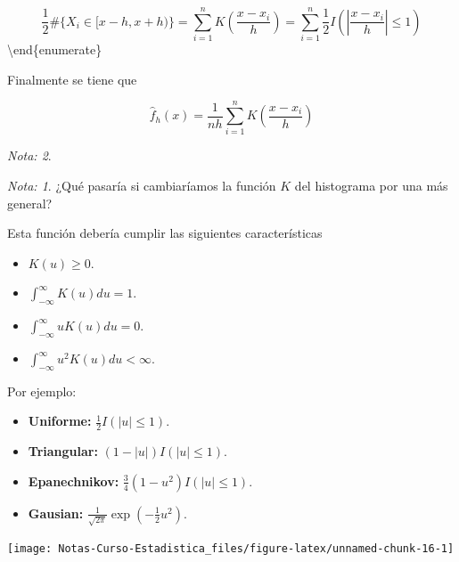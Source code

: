 \documentclass[
  12pt,
]{book}
\providecommand{\tightlist}{%
  \setlength{\itemsep}{0pt}\setlength{\parskip}{0pt}}
\theoremstyle{definition}
\theoremstyle{definition}
\theoremstyle{definition}
\theoremstyle{remark}
\newtheorem*{remark}{Nota: }
\begin{document}
\begin{equation*}
\frac{1}{2}\# \{ X_i \in [x-h,x+h) \}
=\sum_{i=1}^{n} K\left( \frac{x-x_{i}}{h} \right)
=\sum_{i=1}^{n}  \frac{1}{2} I \left( \left\vert \frac{x-x_{i}}{h}
\right\vert \leq 1 \right)
\end{equation*}
\textbackslash end\{enumerate\}

Finalmente se tiene que

\begin{equation*}
\hat{f}_{h}\left( x \right) = \frac{1}{nh}\sum_{i=1}^{n} K\left( \frac{x-x_{i}}{h} \right)
\end{equation*}

\begin{remark}
\begin{remark}

{}¿Qué pasaría si cambiaríamos la función \(K\) del histograma por una más general?

\end{remark}
\end{remark}

Esta función debería cumplir las siguientes características

\begin{itemize}
\tightlist
\item
  \(K(u)\geq 0\).
\item
  \(\int_{-\infty}^{\infty} K(u)du = 1\).
\item
  \(\int_{-\infty}^{\infty} u K(u)du = 0\).
\item
  \(\int_{-\infty}^{\infty} u^{2} K(u)du <\infty\).
\end{itemize}

Por ejemplo:

\begin{itemize}
\tightlist
\item
  \textbf{Uniforme:} \(\frac{1}{2} I \left( \left\vert u \right\vert \leq 1 \right)\).
\item
  \textbf{Triangular:} \((1-|u|) I \left( \left\vert u \right\vert \leq 1 \right)\).
\item
  \textbf{Epanechnikov:} \(\frac{3}{4} (1-u^{2}) I \left( \left\vert u \right\vert \leq 1 \right)\).
\item
  \textbf{Gausian:} \(\frac{1}{\sqrt{2\pi}} \exp \left( -\frac{1}{2}u^{2} \right)\).
\end{itemize}

\begin{center}\texttt{[image: Notas-Curso-Estadistica\_files/figure-latex/unnamed-chunk-16-1]} \end{center}
\end{document}
